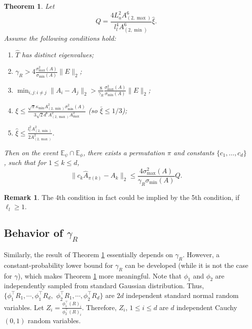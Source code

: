 \documentclass[twoside]{article}
\newcommand{\Epsi}{\mathbb{E}_{\psi}}
\newcommand{\Ephi}{\mathbb{E}_{\phi}}
\newtheorem{thm}[lemma]{Theorem}
\theoremstyle{definition}
\newtheorem{remark}[lemma]{Remark}
\begin{document}
\begin{thm}
\label{thm:Modefficiency}
Let 
 \[ 
 Q=  
 \frac{4L_u^2A^6_{(2,\max)}}{l_l^4 A^6_{(2,\min)}}\widehat{\xi}.
 \] 
 Assume the following conditions hold:
 \begin{enumerate}
 \item $\widehat{T}$ has distinct eigenvalues;
 \item $\gamma_R > 4 \frac{\sigma_{\max}^2(A)}{\sigma_{\min}(A) }\|E\|_2$; 
 \item $\min_{i,j:i\neq j} \|A_i - A_j\|_2 > \frac{8}{\gamma_R}\frac{\sigma_{\max}^2(A)}{\sigma_{\min}(A) } \|E\|_2$;
 \item $\xi \le \frac{\sqrt{\pi}\kappa_{\min}A^2_{(2,\min)}\sigma_{\min}^2(A)}{3\sqrt{2}d^6A_{(2,\max)}^2A_{\max}^2}$
 (so $\bar{\xi} \le 1/3$);
 \item $\widehat{\xi} \le \frac{l_l^2 A^2_{(2,\min)}}{2A^2_{(2,\max)}}$.
 \end{enumerate}
Then on the event $\Epsi \cap\Ephi$, there exists a permutation $\pi$ and constants $\{c_1,\ldots,c_d\}$, such that for $1\le k\le d$,
\[
\| c_k\widehat{A}_{\pi(k)} - A_k\|_2 \le \frac{4\sigma^2_{\max}(A)}{\gamma_R\sigma_{\min}(A)} Q.
\]
\end{thm}
\begin{remark}
The 4th condition in fact could be implied by the 5th condition, if $\ell_l \ge 1$.
\end{remark}

\subsection{Behavior of $\gamma_R$}
\label{subsec:gammaR}
Similarly, the result of Theorem \ref{thm:Modefficiency} essentially depends on $\gamma_R$. 
However, a constant-probability lower bound for $\gamma_R$ can be developed (while it is not the case for $\gamma$), which makes Theorem \ref{thm:Modefficiency} more meaningful. 
Note that $\phi_1$ and $\phi_2$ are independently sampled from standard Gaussian distribution. 
Thus, $\{\phi_1^{\top}R_1, \cdots, \phi_1^{\top}R_d,$ $\phi_2^{\top}R_1, \cdots, \phi_2^{\top}R_d\}$ are $2d$ independent standard normal random variables. 
Let $Z_i = \frac{\phi_1^{\top}(R)_i}{\phi_2^{\top}(R)_i}$. Therefore, $Z_i$, $1\le i\le d$ are $d$ independent Cauchy$(0,1)$ random variables. 
\end{document}
